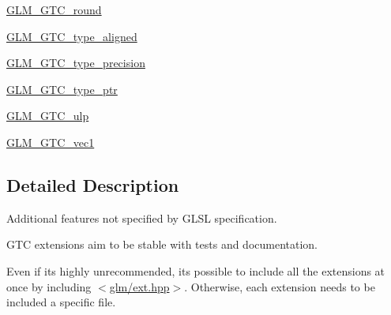 \begin{DoxyCompactItemize}
\item 
\hyperlink{group__gtc__round}{G\+L\+M\+\_\+\+G\+T\+C\+\_\+round}
\item 
\hyperlink{group__gtc__type__aligned}{G\+L\+M\+\_\+\+G\+T\+C\+\_\+type\+\_\+aligned}
\item 
\hyperlink{group__gtc__type__precision}{G\+L\+M\+\_\+\+G\+T\+C\+\_\+type\+\_\+precision}
\item 
\hyperlink{group__gtc__type__ptr}{G\+L\+M\+\_\+\+G\+T\+C\+\_\+type\+\_\+ptr}
\item 
\hyperlink{group__gtc__ulp}{G\+L\+M\+\_\+\+G\+T\+C\+\_\+ulp}
\item 
\hyperlink{group__gtc__vec1}{G\+L\+M\+\_\+\+G\+T\+C\+\_\+vec1}
\end{DoxyCompactItemize}


\subsection{Detailed Description}
Additional features not specified by G\+L\+SL specification. 

G\+TC extensions aim to be stable with tests and documentation.

Even if it\textquotesingle{}s highly unrecommended, it\textquotesingle{}s possible to include all the extensions at once by including $<$\hyperlink{ext_8hpp}{glm/ext.\+hpp}$>$. Otherwise, each extension needs to be included a specific file. 